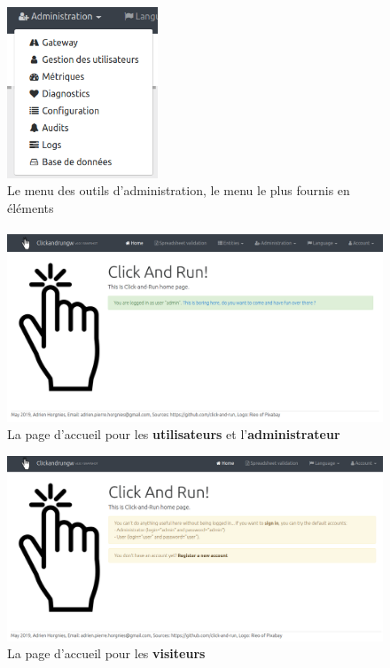 \begin{figure}[ht]
    \centering
    \includegraphics[width=0.4\textwidth]{images/screenshot/menu-admin.png}
    \caption{Le menu des outils d'administration, le menu le plus fournis en éléments}
    \label{fig:menu-admin}
\end{figure}
\paragraph{}

\begin{figure}[ht]
    \centering
    \includegraphics[width=1\textwidth]{images/screenshot/home-page-logged.png}
    \caption{La page d'accueil pour les \textbf{utilisateurs} et l'\textbf{administrateur}}
    \label{fig:home-logged}
\end{figure}

\begin{figure}[ht]
    \centering
    \includegraphics[width=1\textwidth]{images/screenshot/home-page-anon.png}
    \caption{La page d'accueil pour les \textbf{visiteurs}}
    \label{fig:home-anon}
\end{figure}

